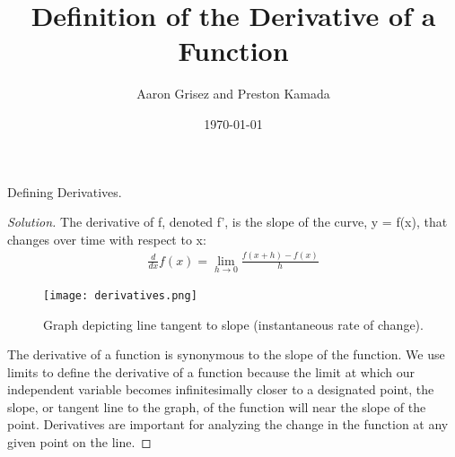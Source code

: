 \documentclass[aps,pra,notitlepage,amsmath,amssymb,letterpaper,12pt]{revtex4-1}
\newenvironment{problem}[2][Problem]{\begin{trivlist}
\item[\hskip \labelsep {\bfseries #1}\hskip \labelsep {\bfseries #2.}]}{\end{trivlist}}
\newenvironment{solution}{\begin{proof}[Solution]}{\end{proof}}
\begin{document}
 
\title{Definition of the Derivative of a Function}
\author{Aaron Grisez and Preston Kamada}
\date{\today}

\maketitle

\begin{problem}{1} 
Defining Derivatives.
\end{problem}
 
\begin{solution} %
The derivative of f, denoted f', is the slope of the curve, y = f(x),
\linebreak that changes over time with respect to x:
\begin{align}
\frac{d}{{dx}}f\left( x \right) = \mathop {\lim }\limits_{h \to 0} \frac{{f\left( {x + h } \right) - f\left( x \right)}}{h}
\end{align}


\begin{figure}[h!] %
  \texttt{[image: derivatives.png]}  %
  \caption{Graph depicting line tangent to slope (instantaneous rate of change).}
  \label{fig:figlabel}
\end{figure}

The derivative of a function is synonymous to the slope of the function. We use limits to define the derivative of a function because the limit at which our independent variable becomes infinitesimally closer to a designated point, the slope, or tangent line to the graph, of the function will near the slope of the point. Derivatives are important for analyzing the change in the function at any given point on the line.
\end{solution}
 
 
 
\end{document}

